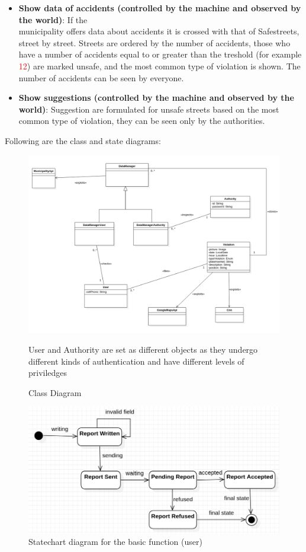 \begin{itemize}
\item \textbf{Show data of accidents (controlled by the machine and observed by the world)}: If the \\ municipality offers data about accidents it is crossed with that of Safestreets, street by street. Streets are ordered by the number of accidents, those who have a number of accidents equal to or greater than the treshold (for example \textcolor{Red}{12}) are marked unsafe, and the most common type of violation is shown. The number of accidents can be seen by everyone.

\item \textbf{Show suggestions (controlled by the machine and observed by the world)}: Suggestion are formulated for unsafe streets based on the most common type of violation, they can be seen only by the authorities.

\end{itemize}

Following are the class and state diagrams: \newpage

\begin{figure}[H]
\centering
\includegraphics[width=\textwidth]{Images/Diagrams/uml.png}
\caption{\label{fig:UML}Class Diagram}
\medskip
\small
User and Authority are set as different objects as they undergo different kinds of authentication and have different levels of priviledges
\end{figure}

\begin{figure} [H]
\centering
\includegraphics[width=\textwidth]{Images/Diagrams/State-1.png}
\caption{\label{fig:State-1}Statechart diagram for the basic function (user)}
\end{figure}

